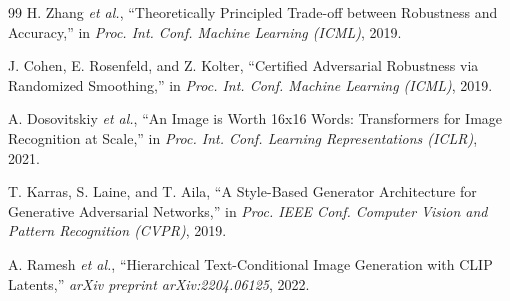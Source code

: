 \documentclass[conference]{IEEEtran}
\begin{document}
\begin{thebibliography}{99}
H. Zhang \textit{et al.}, ``Theoretically Principled Trade-off between Robustness and Accuracy,'' in \textit{Proc. Int. Conf. Machine Learning (ICML)}, 2019.

J. Cohen, E. Rosenfeld, and Z. Kolter, ``Certified Adversarial Robustness via Randomized Smoothing,'' in \textit{Proc. Int. Conf. Machine Learning (ICML)}, 2019.

A. Dosovitskiy \textit{et al.}, ``An Image is Worth 16x16 Words: Transformers for Image Recognition at Scale,'' in \textit{Proc. Int. Conf. Learning Representations (ICLR)}, 2021.

T. Karras, S. Laine, and T. Aila, ``A Style-Based Generator Architecture for Generative Adversarial Networks,'' in \textit{Proc. IEEE Conf. Computer Vision and Pattern Recognition (CVPR)}, 2019.

A. Ramesh \textit{et al.}, ``Hierarchical Text-Conditional Image Generation with CLIP Latents,'' \textit{arXiv preprint arXiv:2204.06125}, 2022.

\end{thebibliography}
\end{document}
